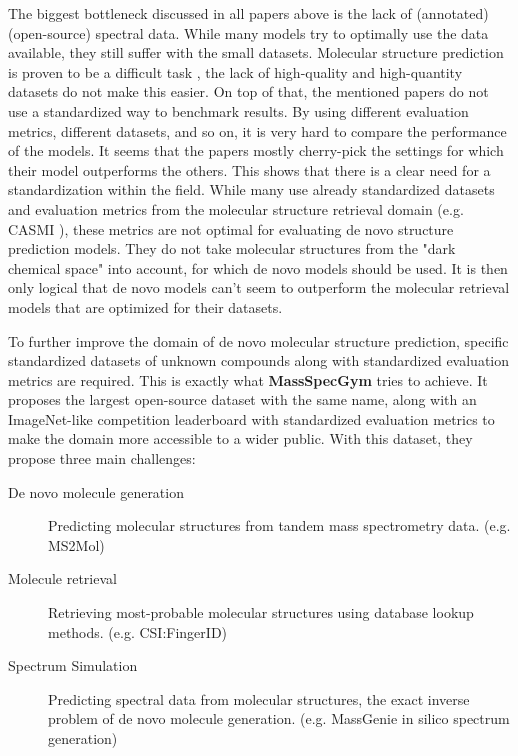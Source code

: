 The biggest bottleneck discussed in all papers above is the lack of (annotated) (open-source) spectral data. While many models try to optimally use the data available, they still suffer with the small datasets. Molecular structure prediction is proven to be a difficult task \cite{kretschmer2023small}, the lack of high-quality and high-quantity datasets do not make this easier.
On top of that, the mentioned papers do not use a standardized way to benchmark results. By using different evaluation metrics, different datasets, and so on, it is very hard to compare the performance of the models. It seems that the papers mostly cherry-pick the settings for which their model outperforms the others. This shows that there is a clear need for a standardization within the field.
While many use already standardized datasets and evaluation metrics from the molecular structure retrieval domain (e.g. CASMI \cite{schymanski2017critical}), these metrics are not optimal for evaluating de novo structure prediction models. They do not take molecular structures from the "dark chemical space" into account, for which de novo models should be used. It is then only logical that de novo models can't seem to outperform the molecular retrieval models that are optimized for their datasets.

To further improve the domain of de novo molecular structure prediction, specific standardized datasets of unknown compounds along with standardized evaluation metrics are required.
This is exactly what \textbf{MassSpecGym} \cite{bushuiev2024massspecgym} tries to achieve. It proposes the largest open-source dataset with the same name, along with an ImageNet-like \cite{5206848} competition leaderboard with standardized evaluation metrics to make the domain more accessible to a wider public.
With this dataset, they propose three main challenges:
\begin{description}
    \item[De novo molecule generation] Predicting molecular structures from tandem mass spectrometry data. (e.g. MS2Mol)
    \item[Molecule retrieval] Retrieving most-probable molecular structures using database lookup methods. (e.g. CSI:FingerID)
    \item[Spectrum Simulation] Predicting spectral data from molecular structures, the exact inverse problem of de novo molecule generation. (e.g. MassGenie in silico spectrum generation)
\end{description}

